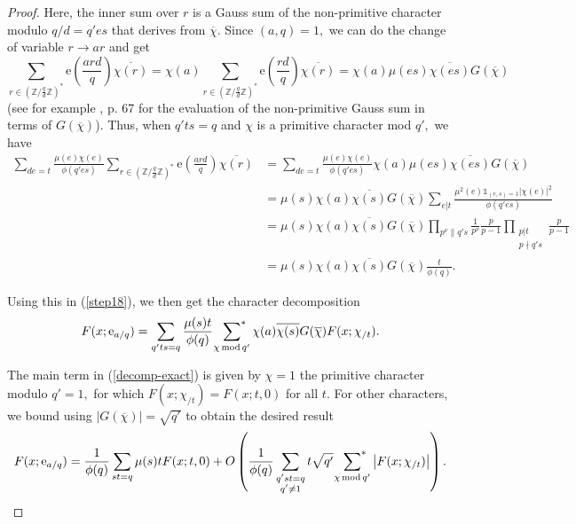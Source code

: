 \documentclass{article}
\newcommand{\Mod}{\,\mathrm{mod}\,}
\newcommand{\e}{\mathrm{e}}
\newcommand{\Z}{\mathds{Z}}
\newcommand{\Ind}{\mathbb{1}}
\newcommand{\starsum}{\ \sideset{}{^*}\sum}
\begin{document}
\begin{proof}
    Here, the inner sum over $r$ is a Gauss sum of the non-primitive character modulo $q/d = q'es$ that derives from $\overline\chi.$ Since $(a, q) = 1,$ we can do the change of variable $r \to ar$ and get $$\sum_{r\in (\Z/\frac{q}{d}\Z)^*} \e\left(\frac{ard}{q}\right) \overline{\chi(r)} = \chi(a) \sum_{r\in (\Z/\frac{q}{d}\Z)^*} \e\left(\frac{rd}{q}\right) \overline{\chi(r)} = \chi(a) \mu(es) \overline{\chi(es)} G(\overline\chi)$$
    (see for example \cite{davenport}, p. 67 for the evaluation of the non-primitive Gauss sum in terms of $G(\overline\chi)$). Thus, when $q'ts = q$ and $\chi$ is a primitive character mod $q',$ we have
    \begin{align*}
        \sum_{de = t} \frac{\mu(e)\chi(e)}{\phi(q'es)} \sum_{r\in (\Z/\frac{q}{d}\Z)^*} \e\left(\frac{ard}{q}\right) \overline{\chi(r)} &= \sum_{de = t} \frac{\mu(e)\chi(e)}{\phi(q'es)} \chi(a) \mu(es) \overline{\chi(es)} G(\overline\chi) 
        \\&= \mu(s)\chi(a)\overline{\chi(s)} G(\overline\chi) \sum_{e|t} \frac{\mu^2(e) \Ind_{(e,s) = 1} |\chi(e)|^2}{\phi(q'es)}
        \\&= \mu(s)\chi(a)\overline{\chi(s)} G(\overline\chi) \prod_{p^\nu\| q's} \frac{1}{p^\nu}\frac{p}{p-1} \prod_{\substack{p|t \\ p\nmid q's}} \frac{p}{p-1}
        \\&= \mu(s)\chi(a)\overline{\chi(s)} G(\overline\chi) \frac{t}{\phi(q)}.
    \end{align*}
    
    Using this in (\ref{step18}), we then get the character decomposition
    \begin{equation}\label{decomp-exact}
        F(x; \e_{a/q}) = \sum_{q'ts = q} \frac{\mu(s)t}{\phi(q)}\starsum_{\chi \Mod q'} \chi(a)\overline{\chi(s)} G(\overline\chi) F(x; \chi_{/t}). 
    \end{equation}

    The main term in (\ref{decomp-exact}) is given by $\chi = 1$ the primitive character modulo $q' = 1,$ for which $F(x; \chi_{/t}) = F(x; t, 0)$ for all $t.$ For other characters, we bound using $|G(\overline\chi)| = \sqrt{q'}$ to obtain the desired result
    \begin{equation*}
        F(x; \e_{a/q}) = \frac{1}{\phi(q)}\sum_{st = q} \mu(s) t F(x; t, 0) + O\left(\frac{1}{\phi(q)}\sum_{\substack{q'st = q \\ q'\ne 1}} t\sqrt{q'}\starsum_{\chi\Mod q'} \left|F(x; \chi_{/t})\right| \right).
    \end{equation*}
\end{proof}
\end{document}
